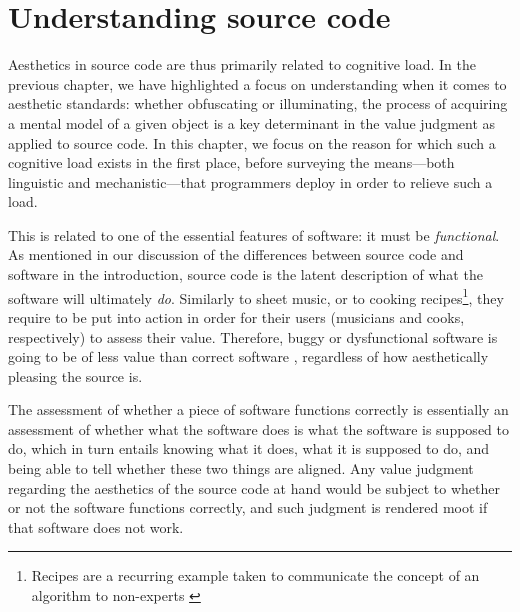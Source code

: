 \chapter{Understanding source code}

Aesthetics in source code are thus primarily related to cognitive load. In the previous chapter, we have highlighted a focus on understanding when it comes to aesthetic standards: whether obfuscating or illuminating, the process of acquiring a mental model of a given object is a key determinant in the value judgment as applied to source code. In this chapter, we focus on the reason for which such a cognitive load exists in the first place, before surveying the means—both linguistic and mechanistic—that programmers deploy in order to relieve such a load.

This is related to one of the essential features of software: it must be \emph{functional}. As mentioned in our discussion of the differences between source code and software in the introduction, source code is the latent description of what the software will ultimately \emph{do}. Similarly to sheet music, or to cooking recipes\footnote{Recipes are a recurring example taken to communicate the concept of an algorithm to non-experts \citep{zeller_algorithms_2020}}, they require to be put into action in order for their users (musicians and cooks, respectively) to assess their value. Therefore, buggy or dysfunctional software is going to be of less value than correct software \citep{hill_what_2016}, regardless of how aesthetically pleasing the source is.

The assessment of whether a piece of software functions correctly is essentially an assessment of whether what the software does is what the software is supposed to do, which in turn entails knowing what it does, what it is supposed to do, and being able to tell whether these two things are aligned. Any value judgment regarding the aesthetics of the source code at hand would be subject to whether or not the software functions correctly, and such judgment is rendered moot if that software does not work.

